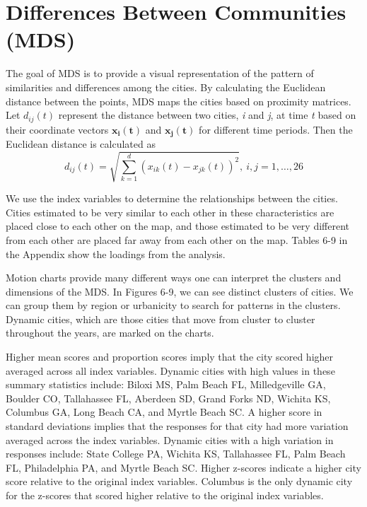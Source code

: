 \documentclass[11pt]{asaproc}
\begin{document}
\section{Differences Between Communities (MDS)}


The goal of MDS is to provide a visual
representation of the pattern of similarities and differences among
the cities. By calculating the Euclidean distance between the points,
MDS maps the cities based on proximity matrices. Let $d_{ij}(t)$
represent the distance between two cities, \emph{i} and \emph{j}, at
time \emph{t} based on their coordinate vectors $\mathbf{x_{i}(t)}$ and
$\mathbf{x_{j}(t)}$ for different time periods. Then the Euclidean
distance is calculated as  
\begin{equation}
d_{ij}(t) = \sqrt{{\sum_{k=1}^d} (x_{ik}(t) - x_{jk}(t))^2}, \  i,j=1,\dots,26
\end{equation}

We use the index variables to determine the relationships
between the cities. Cities estimated to be very similar to each other
in these characteristics are placed close to each other on the map,
and those estimated to be very different from each other are placed
far away from each other on the map. Tables 6-9 in the Appendix show the loadings from the analysis.


Motion charts provide many different ways one can interpret the
clusters and dimensions of the MDS. In Figures
6-9, we can see distinct clusters of cities. We can group them by
region or urbanicity to search for patterns in the clusters. Dynamic
cities, which are those cities that move from cluster to cluster throughout the
years, are marked on the charts. 

Higher mean scores and proportion scores imply that the city scored
higher averaged across all index variables. Dynamic cities with high values in
these summary statistics include: Biloxi MS, Palm Beach FL,
Milledgeville GA, Boulder CO, Tallahassee FL, Aberdeen SD, Grand Forks
ND, Wichita KS, Columbus GA, Long Beach CA, and Myrtle Beach SC. A
higher score in standard deviations implies that the responses for
that city had more variation averaged across the index variables. Dynamic cities with a
high variation in responses include: State College PA, Wichita KS,
Tallahassee FL, Palm Beach FL, Philadelphia PA, and Myrtle Beach SC. Higher
z-scores indicate a higher city score relative to the original index
variables. Columbus is the only dynamic city for the z-scores that
scored higher relative to the original index variables. 
\end{document}

